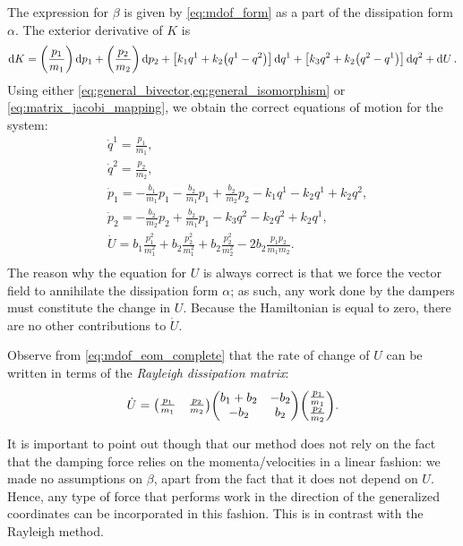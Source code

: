  The expression for \(\beta\) is given by \cref{eq:mdof_form} as a part of the dissipation form \(\alpha\). The exterior derivative of \(K\) is 
     \begin{equation}
     \dd{K} = \qty(\frac{p_1}{m_1})\dd{p_1} + \qty(\frac{p_2}{m_2})\dd{p_2} +  \qty[k_1q^1 + k_2\qty(q^1 - q^2)]\dd{q^1} + \qty[k_3q^2 + k_2\qty(q^2 - q^1)]\dd{q^2} + \dd{U}.
\end{equation}
 Using either \cref{eq:general_bivector,eq:general_isomorphism} or \cref{eq:matrix_jacobi_mapping}, we obtain the correct equations of motion for the system:
 \begin{equation}
     \begin{split}
         &\dot{q}^1 = \frac{p_1}{m_1}, \\
         &\dot{q}^2 = \frac{p_2}{m_2}, \\
         &\dot{p}_1 = -\frac{b_1}{m_1}p_1 - \frac{b_2}{m_1}p_1 + \frac{b_2}{m_2}p_2 - k_1 q^1 - k_2 q^1 + k_2 q^2, \\
         &\dot{p}_2 =  - \frac{b_2}{m_2}p_2 + \frac{b_2}{m_1}p_1 - k_3 q^2 - k_2 q^2 + k_2 q^1, \\
         &\dot{U} = b_1\frac{p_1^2}{m_1^2} + b_2\frac{p_2^2}{m_1^2} +  b_2\frac{p_2^2}{m_2^2} - 2b_2 \frac{p_1 p_2}{m_1 m_2}. \\
     \end{split}
     \label{eq:mdof_eom_complete}
 \end{equation}
The reason why the equation for \(U\) is always correct is that we force the vector field to annihilate the dissipation form \(\alpha\); as such, any work done by the dampers must constitute the change in \(U\). Because the Hamiltonian is equal to zero, there are no other contributions to \(\dot{U}\). 

Observe from \cref{eq:mdof_eom_complete} that the rate of change of \(U\) can be written in terms of the \emph{Rayleigh dissipation matrix}:
\renewcommand{\arraystretch}{1.4}
\begin{equation}
     \dot{U} = \mqty(\tfrac{p_1}{m_1} & \tfrac{p_2}{m_2}) \mqty(b_1 + b_2 & -b_2 \\ -b_2 & b_2) \mqty(\tfrac{p_1}{m_1} \\ \tfrac{p_2}{m_2}).
\end{equation}
\renewcommand{\arraystretch}{1}

It is important to point out though that our method does not rely on the fact that the damping force relies on the momenta/velocities in a linear fashion: we made no assumptions on \(\beta\), apart from the fact that it does not depend on \(U\). Hence, any type of force that performs work in the direction of the generalized coordinates can be incorporated in this fashion. This is in contrast with the Rayleigh method. 


